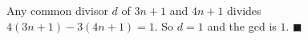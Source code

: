 Any common divisor $d$ of $3n+1$ and $4n+1$ divides $4(3n+1)-3(4n+1)=1$. So $d=1$ and the gcd is $1$. $\blacksquare$

